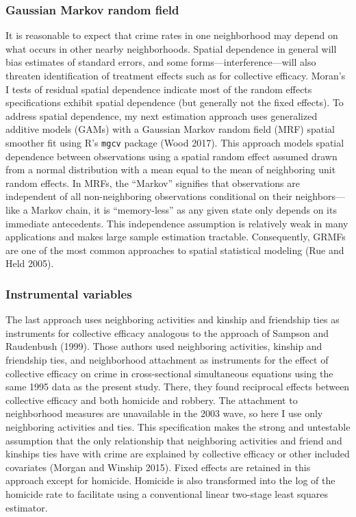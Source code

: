 \documentclass [11pt, proquest] {uwthesis}[2015/03/03]
\begin{document}
\hypertarget{gaussian-markov-random-field}{%
\subsubsection{Gaussian Markov random field}\label{gaussian-markov-random-field}}

It is reasonable to expect that crime rates in one neighborhood may depend on what occurs in other nearby neighborhoods. Spatial dependence in general will bias estimates of standard errors, and some forms---interference---will also threaten identification of treatment effects such as for collective efficacy. Moran's I tests of residual spatial dependence indicate most of the random effects specifications exhibit spatial dependence (but generally not the fixed effects). To address spatial dependence, my next estimation approach uses generalized additive models (GAMs) with a Gaussian Markov random field (MRF) spatial smoother fit using R's \texttt{mgcv} package (Wood 2017). This approach models spatial dependence between observations using a spatial random effect assumed drawn from a normal distribution with a mean equal to the mean of neighboring unit random effects. In MRFs, the ``Markov'' signifies that observations are independent of all non-neighboring observations conditional on their neighbors---like a Markov chain, it is ``memory-less'' as any given state only depends on its immediate antecedents. This independence assumption is relatively weak in many applications and makes large sample estimation tractable. Consequently, GRMFs are one of the most common approaches to spatial statistical modeling (Rue and Held 2005).

\hypertarget{instrumental-variables}{%
\subsubsection{Instrumental variables}\label{instrumental-variables}}

The last approach uses neighboring activities and kinship and friendship ties as instruments for collective efficacy analogous to the approach of Sampson and Raudenbush (1999). Those authors used neighboring activities, kinship and friendship ties, and neighborhood attachment as instruments for the effect of collective efficacy on crime in cross-sectional simultaneous equations using the same 1995 data as the present study. There, they found reciprocal effects between collective efficacy and both homicide and robbery. The attachment to neighborhood measures are unavailable in the 2003 wave, so here I use only neighboring activities and ties. This specification makes the strong and untestable assumption that the only relationship that neighboring activities and friend and kinships ties have with crime are explained by collective efficacy or other included covariates (Morgan and Winship 2015). Fixed effects are retained in this approach except for homicide. Homicide is also transformed into the log of the homicide rate to facilitate using a conventional linear two-stage least squares estimator.
\end{document}
